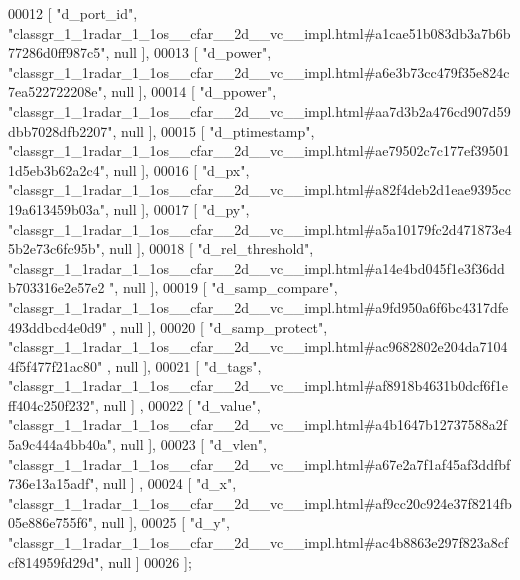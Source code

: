 \begin{DoxyCode}
00012     [ \textcolor{stringliteral}{"d\_port\_id"}, \textcolor{stringliteral}{"classgr\_1\_1radar\_1\_1os\_\_cfar\_\_2d\_\_vc\_\_impl.html#a1cae51b083db3a7b6b77286d0ff987c5"}, 
      null ],
00013     [ \textcolor{stringliteral}{"d\_power"}, \textcolor{stringliteral}{"classgr\_1\_1radar\_1\_1os\_\_cfar\_\_2d\_\_vc\_\_impl.html#a6e3b73cc479f35e824c7ea522722208e"}, null 
      ],
00014     [ \textcolor{stringliteral}{"d\_ppower"}, \textcolor{stringliteral}{"classgr\_1\_1radar\_1\_1os\_\_cfar\_\_2d\_\_vc\_\_impl.html#aa7d3b2a476cd907d59dbb7028dfb2207"}, null
       ],
00015     [ \textcolor{stringliteral}{"d\_ptimestamp"}, \textcolor{stringliteral}{"classgr\_1\_1radar\_1\_1os\_\_cfar\_\_2d\_\_vc\_\_impl.html#ae79502c7c177ef395011d5eb3b62a2c4"}, 
      null ],
00016     [ \textcolor{stringliteral}{"d\_px"}, \textcolor{stringliteral}{"classgr\_1\_1radar\_1\_1os\_\_cfar\_\_2d\_\_vc\_\_impl.html#a82f4deb2d1eae9395cc19a613459b03a"}, null ],
00017     [ \textcolor{stringliteral}{"d\_py"}, \textcolor{stringliteral}{"classgr\_1\_1radar\_1\_1os\_\_cfar\_\_2d\_\_vc\_\_impl.html#a5a10179fc2d471873e45b2e73c6fc95b"}, null ],
00018     [ \textcolor{stringliteral}{"d\_rel\_threshold"}, \textcolor{stringliteral}{"classgr\_1\_1radar\_1\_1os\_\_cfar\_\_2d\_\_vc\_\_impl.html#a14e4bd045f1e3f36ddb703316e2e57e2
      "}, null ],
00019     [ \textcolor{stringliteral}{"d\_samp\_compare"}, \textcolor{stringliteral}{"classgr\_1\_1radar\_1\_1os\_\_cfar\_\_2d\_\_vc\_\_impl.html#a9fd950a6f6bc4317dfe493ddbcd4e0d9"}
      , null ],
00020     [ \textcolor{stringliteral}{"d\_samp\_protect"}, \textcolor{stringliteral}{"classgr\_1\_1radar\_1\_1os\_\_cfar\_\_2d\_\_vc\_\_impl.html#ac9682802e204da71044f5f477f21ac80"}
      , null ],
00021     [ \textcolor{stringliteral}{"d\_tags"}, \textcolor{stringliteral}{"classgr\_1\_1radar\_1\_1os\_\_cfar\_\_2d\_\_vc\_\_impl.html#af8918b4631b0dcf6f1eff404c250f232"}, null ]
      ,
00022     [ \textcolor{stringliteral}{"d\_value"}, \textcolor{stringliteral}{"classgr\_1\_1radar\_1\_1os\_\_cfar\_\_2d\_\_vc\_\_impl.html#a4b1647b12737588a2f5a9c444a4bb40a"}, null 
      ],
00023     [ \textcolor{stringliteral}{"d\_vlen"}, \textcolor{stringliteral}{"classgr\_1\_1radar\_1\_1os\_\_cfar\_\_2d\_\_vc\_\_impl.html#a67e2a7f1af45af3ddfbf736e13a15adf"}, null ]
      ,
00024     [ \textcolor{stringliteral}{"d\_x"}, \textcolor{stringliteral}{"classgr\_1\_1radar\_1\_1os\_\_cfar\_\_2d\_\_vc\_\_impl.html#af9cc20c924e37f8214fb05e886e755f6"}, null ],
00025     [ \textcolor{stringliteral}{"d\_y"}, \textcolor{stringliteral}{"classgr\_1\_1radar\_1\_1os\_\_cfar\_\_2d\_\_vc\_\_impl.html#ac4b8863e297f823a8cfcf814959fd29d"}, null ]
00026 ];
\end{DoxyCode}
